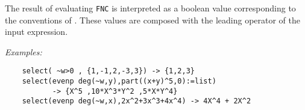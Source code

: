 The result of evaluating \texttt{FNC} is
interpreted as a boolean value corresponding to the conventions of
\REDUCE. These values are composed with the leading operator of the
input expression.

\textit{Examples:}\nopagebreak
\begin{verbatim}
    select( ~w>0 , {1,-1,2,-3,3}) -> {1,2,3}
    select(evenp deg(~w,y),part((x+y)^5,0):=list)
           -> {X^5 ,10*X^3*Y^2 ,5*X*Y^4}
    select(evenp deg(~w,x),2x^2+3x^3+4x^4) -> 4X^4 + 2X^2
\end{verbatim}
